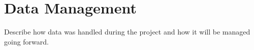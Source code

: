 \section{Data Management}


Describe how data was handled during the project and how it will be managed going forward.
